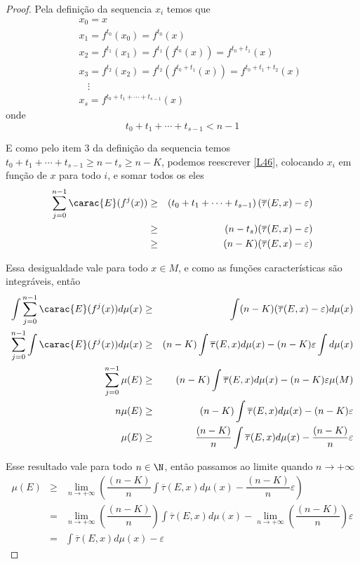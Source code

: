 \begin{proof}
Pela definição da sequencia $x_i$ temos que
\begin{eqnarray*}
&& x_0 = x\\
&& x_1 = f^{t_0}(x_0) = f^{t_0}(x)\\
&& x_2 = f^{t_1}(x_1) = f^{t_1}(f^{t_0}(x)) = f^{t_0+t_1}(x)\\
&& x_3 = f^{t_2}(x_2) = f^{t_2}(f^{t_0+t_1}(x)) = f^{t_0+t_1+t_2}(x)\\
&& \ \ \ \ \vdots\\
&& x_s = f^{t_0+t_1+\cdots+t_{s-1}}(x)
\end{eqnarray*}\vspace{0.1cm}
onde 
\begin{equation*}
t_0+t_1+\cdots+t_{s-1}<n-1
\end{equation*}\vspace{0.1cm}

E como pelo item 3 da definição da sequencia temos $t_0+t_1+\cdots+t_{s-1}\geq n-t_s \geq n-K$, podemos reescrever \eqref{L46}, colocando $x_i$ em função de $x$ para todo $i$, e somar todos os eles
\begin{eqnarray}
\sum_{j=0}^{n-1}\carac{E}(f^j(x)) & \geq & \left(t_0+t_1+\cdots+t_{s-1}\right)(\overline{\tau}(E,x)-\varepsilon)\nonumber\\
& \geq & (n-t_s)(\overline{\tau}(E,x)-\varepsilon)\nonumber\\
& \geq & (n-K)(\overline{\tau}(E,x)-\varepsilon)\label{L477}
\end{eqnarray}\vspace{0.1cm}

Essa desigualdade vale para todo $x\in M$, e como as funções características são integráveis, então
\begin{eqnarray*}
\int\sum_{j=0}^{n-1}\carac{E}(f^j(x))d\mu(x) & \geq & \int(n-K)(\overline{\tau}(E,x)-\varepsilon)d\mu(x)\\
\sum_{j=0}^{n-1}\int\carac{E}(f^j(x))d\mu(x) & \geq & (n-K)\int\overline{\tau}(E,x)d\mu(x)-(n-K)\varepsilon\int d\mu(x)\\
\sum_{j=0}^{n-1}\mu(E) & \geq & (n-K)\int\overline{\tau}(E,x)d\mu(x)-(n-K)\varepsilon\mu(M)\\
n\mu(E) & \geq & (n-K)\int\overline{\tau}(E,x)d\mu(x)-(n-K)\varepsilon\\
\mu(E) & \geq & \dfrac{(n-K)}{n}\int\overline{\tau}(E,x)d\mu(x)-\dfrac{(n-K)}{n}\varepsilon
\end{eqnarray*}\vspace{0.1cm}

Esse resultado vale para todo $n\in\N$, então passamos ao limite quando $n\to+\infty$
\begin{eqnarray*}
\mu(E) & \geq & \lim_{n\to+\infty}\left(\dfrac{(n-K)}{n}\int\overline{\tau}(E,x)d\mu(x)-\dfrac{(n-K)}{n}\varepsilon\right)\\
& = & \lim_{n\to+\infty}\left(\dfrac{(n-K)}{n}\right)\int\overline{\tau}(E,x)d\mu(x)-\lim_{n\to+\infty}\left(\dfrac{(n-K)}{n}\right)\varepsilon\\
& = & \int\overline{\tau}(E,x)d\mu(x)-\varepsilon
\end{eqnarray*}\vspace{0.1cm}


\end{proof}
